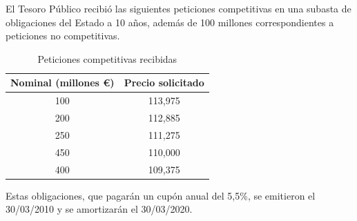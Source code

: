 El Tesoro Público recibió las siguientes peticiones competitivas en una subasta de obligaciones del Estado a 10 años, además de 100 millones correspondientes a peticiones no competitivas.

\begin{table}[H]
\centering
\begin{tabular}{|c|c|}
\hline
Nominal (millones €) & Precio solicitado \\ \hline
100                  & 113,975           \\ \hline
200                  & 112,885           \\ \hline
250                  & 111,275           \\ \hline
450                  & 110,000           \\ \hline
400                  & 109,375           \\ \hline
\end{tabular}
\caption{Peticiones competitivas recibidas}
\end{table}

Estas obligaciones, que pagarán un cupón anual del 5,5\%, se emitieron el 30/03/2010 y se amortizarán el 30/03/2020.


